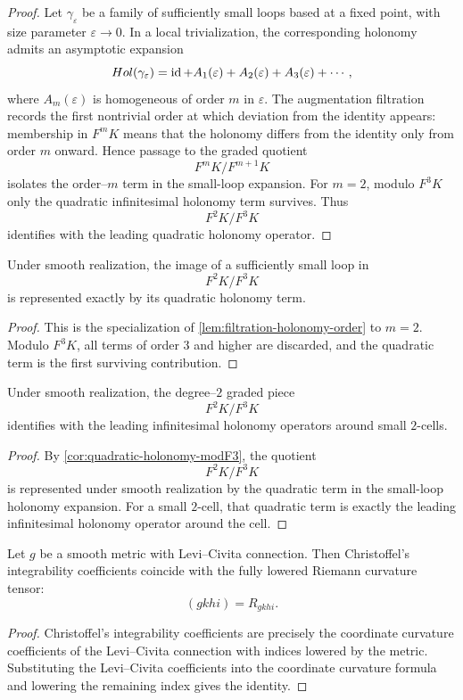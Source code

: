 \begin{proof}
	Let \(\gamma_\varepsilon\) be a family of sufficiently small loops
	based at a fixed point, with size parameter \(\varepsilon\to 0\).  In a
	local trivialization, the corresponding holonomy admits an asymptotic
	expansion
	\[
		Hol(\gamma_\varepsilon)
		=
		\operatorname{id} + A_1(\varepsilon)+A_2(\varepsilon)+A_3(\varepsilon)+\cdots,
	\]
	where \(A_m(\varepsilon)\) is homogeneous of order \(m\) in
	\(\varepsilon\).
	The augmentation filtration records the first nontrivial order at which
	deviation from the identity appears: membership in \(F^mK\) means that
	the holonomy differs from the identity only from order \(m\) onward.
	Hence passage to the graded quotient
	\[
		F^mK/F^{m+1}K
	\]
	isolates the order--\(m\) term in the small-loop expansion.
	For \(m=2\), modulo \(F^3K\) only the quadratic infinitesimal holonomy
	term survives.  Thus
	\[
		F^2K/F^3K
	\]
	identifies with the leading quadratic holonomy operator.
\end{proof}
\begin{corollary}
	\label{cor:quadratic-holonomy-modF3}
	Under smooth realization, the image of a sufficiently small loop in
	\[
		F^2K/F^3K
	\]
	is represented exactly by its quadratic holonomy term.
\end{corollary}
\begin{proof}
	This is the specialization of
	\cref{lem:filtration-holonomy-order} to \(m=2\).  Modulo \(F^3K\), all
	terms of order \(3\) and higher are discarded, and the quadratic term
	is the first surviving contribution.
\end{proof}
\begin{proposition}
	\label{prop:graded-holonomy}
	Under smooth realization, the degree--\(2\) graded piece
	\[
		F^2K/F^3K
	\]
	identifies with the leading infinitesimal holonomy operators around
	small \(2\)-cells.
\end{proposition}
\begin{proof}
	By \cref{cor:quadratic-holonomy-modF3}, the quotient
	\[
		F^2K/F^3K
	\]
	is represented under smooth realization by the quadratic term in the
	small-loop holonomy expansion.  For a small \(2\)-cell, that quadratic
	term is exactly the leading infinitesimal holonomy operator around the
	cell.
\end{proof}
\begin{proposition}
	\label{prop:christoffel}
	Let \(g\) be a smooth metric with Levi--Civita connection.  Then
	Christoffel's integrability coefficients coincide with the fully
	lowered Riemann curvature tensor:
	\[
		(gkhi)=R_{gkhi}.
	\]
\end{proposition}
\begin{proof}
	Christoffel's integrability coefficients are precisely the coordinate
	curvature coefficients of the Levi--Civita connection with indices
	lowered by the metric.  Substituting the Levi--Civita coefficients into
	the coordinate curvature formula and lowering the remaining index gives
	the identity.
\end{proof}
